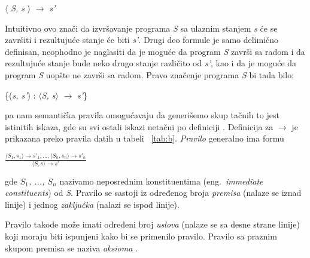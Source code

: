\documentclass[a4paper]{article}
\begin{document}
{\begin{center}$\langle$ \textit{S, s} $\rangle$ $\rightarrow$ \textit{s'} \end{center}
Intuitivno ovo znači da izvršavanje programa \textit{S} sa ulaznim stanjem \textit{s} će se završiti i rezultujuće stanje će biti \textit{s'}. Drugi deo formule je samo delimično definisan, neophodno je naglasiti da je moguće da program \textit{S} završi sa radom i da rezultujuće stanje bude neko drugo stanje različito od \textit{s'}, kao i da je moguće da program \textit{S} uopšte ne završi sa radom. Pravo značenje programa \textit{S} bi tada bilo:
\begin{center}\{(\textit{s, s'}) : $\langle$\textit{S, s}$\rangle$ $\rightarrow$ \textit{s'}\} \end{center} 
pa nam semantička pravila omogućavaju da generišemo skup tačnih to jest istinitih iskaza, gde su svi ostali iskazi netačni po definiciji \cite{wiley}.
Definicija za $\rightarrow$ je prikazana preko pravila datih u tabeli ~\ref{tab:b}. \textit{Pravilo} generalno ima formu

{\large \begin{center}$\frac{\langle S_1, s_1 \rangle \rightarrow s'_1, ... , \langle S_n, s_n \rangle \rightarrow s'_n}{\langle S, s \rangle \rightarrow s'}$ \end{center}}

gde \textit{$S_1$, ..., $S_n$} nazivamo neposrednim konstituentima (eng.~{\em immediate constituents}) od \textit{S}. Pravilo se sastoji iz određenog broja \textit{premisa} (nalaze se iznad linije) i jednog \textit{zaključka} (nalazi se ispod linije).

Pravilo takođe može imati određeni broj \textit{uslova} (nalaze se sa desne strane linije) koji moraju biti ispunjeni kako bi se primenilo pravilo. Pravilo sa praznim skupom premisa se naziva \textit{aksioma} \cite{wiley}.

}
\end{document}
